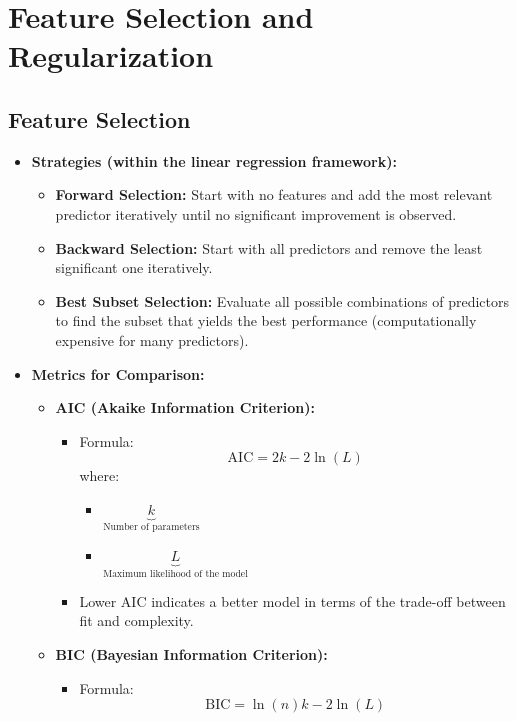 \documentclass[10pt]{article}
\begin{document}
\section{Feature Selection and Regularization}
\subsection{Feature Selection}
\begin{itemize}
    \item \textbf{Strategies (within the linear regression framework):}
    \begin{itemize}
        \item \textbf{Forward Selection:} Start with no features and add the most relevant predictor iteratively until no significant improvement is observed.
        \item \textbf{Backward Selection:} Start with all predictors and remove the least significant one iteratively.
        \item \textbf{Best Subset Selection:} Evaluate all possible combinations of predictors to find the subset that yields the best performance (computationally expensive for many predictors).
    \end{itemize}
    \item \textbf{Metrics for Comparison:}
    \begin{itemize}
        \item \textbf{AIC (Akaike Information Criterion):}
        \begin{itemize}
            \item Formula:
            \[
            \text{AIC} = 2k - 2\ln(L)
            \]
            where:
            \begin{itemize}
                \item \(\underbrace{k}_{\text{Number of parameters}}\)
                \item \(\underbrace{L}_{\text{Maximum likelihood of the model}}\)
            \end{itemize}
            \item Lower AIC indicates a better model in terms of the trade-off between fit and complexity.
        \end{itemize}
        \item \textbf{BIC (Bayesian Information Criterion):}
        \begin{itemize}
            \item Formula:
            \[
            \text{BIC} = \ln(n)k - 2\ln(L)
\]
\end{itemize}
\end{itemize}
\end{itemize}
\end{document}
